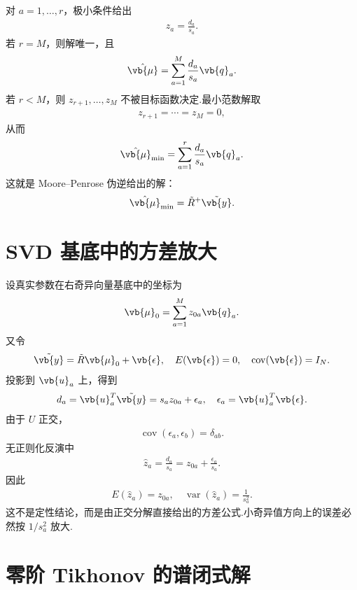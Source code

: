 对 \(a=1,\ldots,r\)，极小条件给出
\begin{align*}
	z_a=\frac{d_a}{s_a}.
\end{align*}
若 \(r=M\)，则解唯一，且
\begin{align*}
	\hat{\vb{\mu}}
	=\sum_{a=1}^{M}\frac{d_a}{s_a}\vb{q}_a.
\end{align*}
若 \(r<M\)，则 \(z_{r+1},\ldots,z_M\) 不被目标函数决定.最小范数解取
\begin{align*}
	z_{r+1}=\cdots=z_M=0,
\end{align*}
从而
\begin{align*}
	\hat{\vb{\mu}}_{\rm min}
	=\sum_{a=1}^{r}\frac{d_a}{s_a}\vb{q}_a.
\end{align*}
这就是 Moore--Penrose 伪逆给出的解：
\begin{align*}
	\hat{\vb{\mu}}_{\rm min}
	=\tilde{R}^{+}\tilde{\vb{y}}.
\end{align*}

\section{SVD 基底中的方差放大}

设真实参数在右奇异向量基底中的坐标为
\begin{align*}
	\vb{\mu}_0=\sum_{a=1}^{M}z_{0a}\vb{q}_a.
\end{align*}
又令
\begin{align*}
	\tilde{\vb{y}}=\tilde{R}\vb{\mu}_0+\vb{\epsilon},
	\quad
	E(\vb{\epsilon})=0,\quad
	\operatorname{cov}(\vb{\epsilon})=I_N.
\end{align*}
投影到 \(\vb{u}_a\) 上，得到
\begin{align*}
	d_a=\vb{u}_a^T\tilde{\vb{y}}
	=s_az_{0a}+\epsilon_a,
	\quad
	\epsilon_a=\vb{u}_a^T\vb{\epsilon}.
\end{align*}
由于 \(U\) 正交，
\begin{align*}
	\operatorname{cov}(\epsilon_a,\epsilon_b)=\delta_{ab}.
\end{align*}
无正则化反演中
\begin{align*}
	\hat{z}_a=\frac{d_a}{s_a}
	=z_{0a}+\frac{\epsilon_a}{s_a}.
\end{align*}
因此
\begin{align*}
	E(\hat{z}_a)=z_{0a},\quad
	\operatorname{var}(\hat{z}_a)=\frac{1}{s_a^2}.
\end{align*}
这不是定性结论，而是由正交分解直接给出的方差公式.小奇异值方向上的误差必然按 \(1/s_a^2\) 放大.

\section{零阶 Tikhonov 的谱闭式解}

